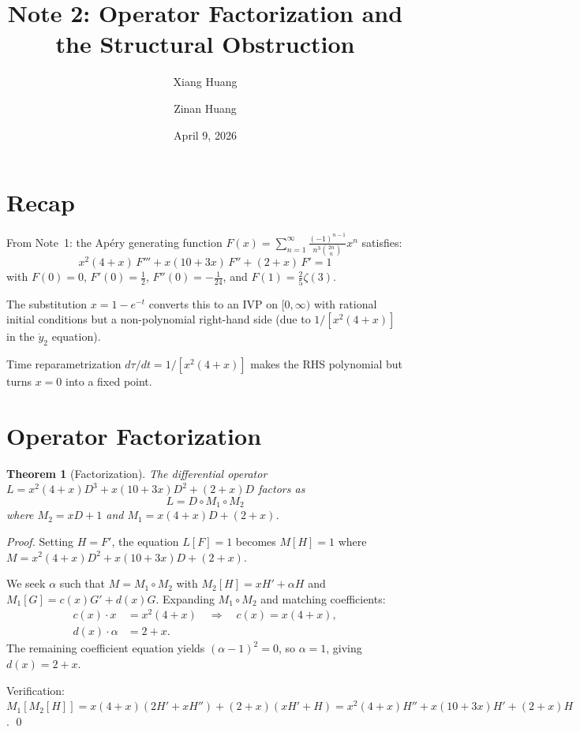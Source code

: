 \documentclass[11pt]{article}
\title{Note 2: Operator Factorization and the Structural Obstruction}
\author{Xiang Huang \and Zinan Huang}
\date{April 9, 2026}
\newtheorem{theorem}{Theorem}
\theoremstyle{definition}
\theoremstyle{remark}
\begin{document}
\maketitle

\section{Recap}

From Note~1: the Ap\'ery generating function $F(x) = \sum_{n=1}^{\infty} \frac{(-1)^{n-1}}{n^3 \binom{2n}{n}} x^n$ satisfies:
\begin{equation}\label{eq:ode}
  x^2(4+x)\,F''' + x(10+3x)\,F'' + (2+x)\,F' = 1
\end{equation}
with $F(0)=0$, $F'(0)=\frac{1}{2}$, $F''(0)=-\frac{1}{24}$, and $F(1)=\frac{2}{5}\zeta(3)$.

The substitution $x = 1-e^{-t}$ converts this to an IVP on $[0,\infty)$ with rational initial conditions but a non-polynomial right-hand side (due to $1/[x^2(4+x)]$ in the $\dot{y}_2$ equation).

Time reparametrization $d\tau/dt = 1/[x^2(4+x)]$ makes the RHS polynomial but turns $x=0$ into a fixed point.

\section{Operator Factorization}

\begin{theorem}[Factorization]
The differential operator $L = x^2(4+x)D^3 + x(10+3x)D^2 + (2+x)D$ factors as
\[
  L = D \circ M_1 \circ M_2
\]
where $M_2 = xD + 1$ and $M_1 = x(4+x)D + (2+x)$.
\end{theorem}

\begin{proof}
Setting $H = F'$, the equation $L[F]=1$ becomes $M[H]=1$ where $M = x^2(4+x)D^2 + x(10+3x)D + (2+x)$.

We seek $\alpha$ such that $M = M_1 \circ M_2$ with $M_2[H] = xH' + \alpha H$ and $M_1[G] = c(x)G' + d(x)G$. Expanding $M_1 \circ M_2$ and matching coefficients:
\begin{align*}
  c(x) \cdot x &= x^2(4+x) \quad\Rightarrow\quad c(x) = x(4+x), \\
  d(x) \cdot \alpha &= 2+x.
\end{align*}
The remaining coefficient equation yields $(\alpha-1)^2 = 0$, so $\alpha = 1$, giving $d(x) = 2+x$.

Verification: $M_1[M_2[H]] = x(4+x)(2H'+xH'') + (2+x)(xH'+H) = x^2(4+x)H'' + x(10+3x)H' + (2+x)H$. \qed
\end{proof}
\end{document}
